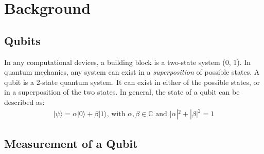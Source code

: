 \documentclass[a4paper]{article}
\begin{document}
\section{Background} %
\label{sec:background}

\subsection{Qubits} %
\label{sub:qubits}

In any computational devices, a building block is a two-state system (0, 1). In quantum mechanics, any system can exist in a \textit{superposition} of possible states. A qubit is a 2-state quantum system. It can exist in either of the possible states, or in a superposition of the two states. In general, the state of a qubit can be described as:
\begin{gather*}
    |\psi\rangle = \alpha|0\rangle + \beta|1\rangle\text{, with }\alpha, \beta \in \mathbb{C} \text{ and }|\alpha|^2 + |\beta|^2 = 1
\end{gather*}

\subsection{Measurement of a Qubit} %
\label{sub:measurement of a qubit}
\end{document}
